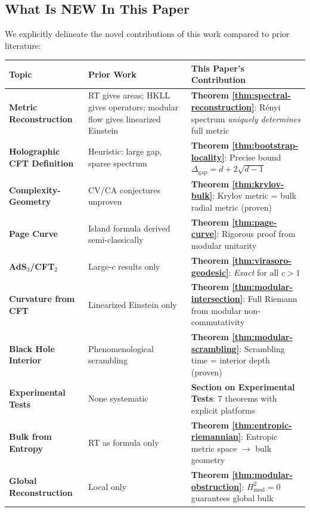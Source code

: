 \documentclass[12pt,a4paper]{article}
\begin{document}
\subsection{What Is NEW In This Paper}

We explicitly delineate the novel contributions of this work compared to prior literature:

\begin{center}
\begin{tabular}{|p{4cm}|p{5cm}|p{5cm}|}
\hline
\textbf{Topic} & \textbf{Prior Work} & \textbf{This Paper's Contribution} \\
\hline
\textbf{Metric Reconstruction} & RT gives areas; HKLL gives operators; modular flow gives linearized Einstein & \textbf{Theorem \ref{thm:spectral-reconstruction}}: R\'enyi spectrum \emph{uniquely determines} full metric \\
\hline
\textbf{Holographic CFT Definition} & Heuristic: large gap, sparse spectrum & \textbf{Theorem \ref{thm:bootstrap-locality}}: Precise bound $\Delta_{\text{gap}} = d + 2\sqrt{d-1}$ \\
\hline
\textbf{Complexity-Geometry} & CV/CA conjectures unproven & \textbf{Theorem \ref{thm:krylov-bulk}}: Krylov metric = bulk radial metric (proven) \\
\hline
\textbf{Page Curve} & Island formula derived semi-classically & \textbf{Theorem \ref{thm:page-curve}}: Rigorous proof from modular unitarity \\
\hline
\textbf{AdS$_3$/CFT$_2$} & Large-$c$ results only & \textbf{Theorem \ref{thm:virasoro-geodesic}}: \emph{Exact} for all $c > 1$ \\
\hline
\textbf{Curvature from CFT} & Linearized Einstein only & \textbf{Theorem \ref{thm:modular-intersection}}: Full Riemann from modular non-commutativity \\
\hline
\textbf{Black Hole Interior} & Phenomenological scrambling & \textbf{Theorem \ref{thm:modular-scrambling}}: Scrambling time = interior depth (proven) \\
\hline
\textbf{Experimental Tests} & None systematic & \textbf{Section on Experimental Tests}: 7 theorems with explicit platforms \\
\hline
\textbf{Bulk from Entropy} & RT as formula only & \textbf{Theorem \ref{thm:entropic-riemannian}}: Entropic metric space $\to$ bulk geometry \\
\hline
\textbf{Global Reconstruction} & Local only & \textbf{Theorem \ref{thm:modular-obstruction}}: $H^2_{\text{mod}} = 0$ guarantees global bulk \\

\end{tabular}
\end{center}
\end{document}
